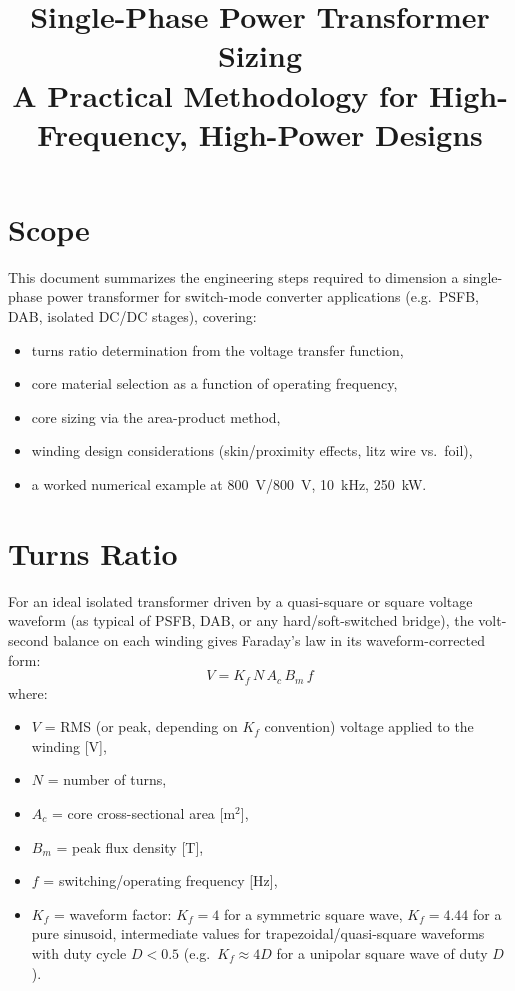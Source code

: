 \documentclass[11pt,a4paper]{article}
\title{Single-Phase Power Transformer Sizing\\
\large A Practical Methodology for High-Frequency, High-Power Designs}
\author{}
\date{}
\begin{document}
\maketitle

\section{Scope}
This document summarizes the engineering steps required to dimension a single-phase
power transformer for switch-mode converter applications (e.g.\ PSFB, DAB, isolated
DC/DC stages), covering:
\begin{itemize}
    \item turns ratio determination from the voltage transfer function,
    \item core material selection as a function of operating frequency,
    \item core sizing via the area-product method,
    \item winding design considerations (skin/proximity effects, litz wire vs.\ foil),
    \item a worked numerical example at \SI{800}{V}/\SI{800}{V}, \SI{10}{kHz}, \SI{250}{kW}.
\end{itemize}

\section{Turns Ratio}
For an ideal isolated transformer driven by a quasi-square or square voltage waveform
(as typical of PSFB, DAB, or any hard/soft-switched bridge), the volt-second balance on
each winding gives Faraday's law in its waveform-corrected form:
\begin{equation}
    V = K_f \, N \, A_c \, B_{m} \, f
    \label{eq:faraday}
\end{equation}
where:
\begin{itemize}
    \item $V$ = RMS (or peak, depending on $K_f$ convention) voltage applied to the winding [V],
    \item $N$ = number of turns,
    \item $A_c$ = core cross-sectional area [m$^2$],
    \item $B_m$ = peak flux density [T],
    \item $f$ = switching/operating frequency [Hz],
    \item $K_f$ = waveform factor: $K_f = 4$ for a symmetric square wave, $K_f = 4.44$ for a pure sinusoid, intermediate values for trapezoidal/quasi-square waveforms with duty cycle $D<0.5$ (e.g.\ $K_f \approx 4D$ for a unipolar square wave of duty $D$).
\end{itemize}
\end{document}

